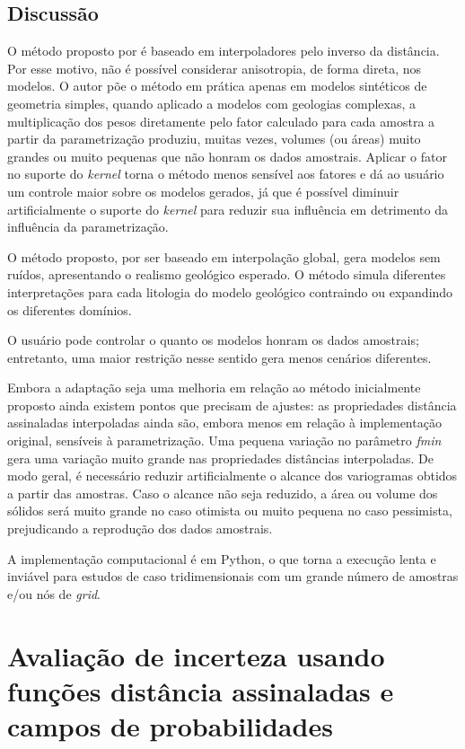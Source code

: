 \subsection{Discussão}

O método proposto por  é baseado em interpoladores pelo inverso da distância. Por esse motivo, não é possível considerar anisotropia, de forma direta, nos modelos. O autor põe o método em prática apenas em modelos sintéticos de geometria simples, quando aplicado a modelos com geologias complexas, a multiplicação dos pesos diretamente pelo fator calculado para cada amostra a partir da parametrização produziu, muitas vezes, volumes (ou áreas) muito grandes ou muito pequenas que não honram os dados amostrais. Aplicar o fator no suporte do \textit{kernel} torna o método menos sensível aos fatores e dá ao usuário um controle maior sobre os modelos gerados, já que é possível diminuir artificialmente o suporte do \textit{kernel} para reduzir sua influência em detrimento da influência da parametrização.

O método proposto, por ser baseado em interpolação global, gera modelos sem ruídos, apresentando o realismo geológico esperado. O método simula diferentes interpretações para cada litologia do modelo geológico contraindo ou expandindo os diferentes domínios.

O usuário pode controlar o quanto os modelos honram os dados amostrais; entretanto, uma maior restrição nesse sentido gera menos cenários diferentes.

Embora a adaptação seja uma melhoria em relação ao método inicialmente proposto ainda existem pontos que precisam de ajustes: as propriedades distância assinaladas interpoladas ainda são, embora menos em relação à implementação original, sensíveis à parametrização. Uma pequena variação no parâmetro \textit{fmin} gera uma variação muito grande nas propriedades distâncias interpoladas. De modo geral, é necessário reduzir artificialmente o alcance dos variogramas obtidos a partir das amostras. Caso o alcance não seja reduzido, a área ou volume dos sólidos será muito grande no caso otimista ou muito pequena no caso pessimista, prejudicando a reprodução dos dados amostrais.

A implementação computacional é em Python, o que torna a execução lenta e inviável para estudos de caso tridimensionais com um grande número de amostras e/ou nós de \textit{grid}.

\section{Avaliação de incerteza usando funções distância assinaladas e campos de probabilidades}\label{pfiels_sec}

